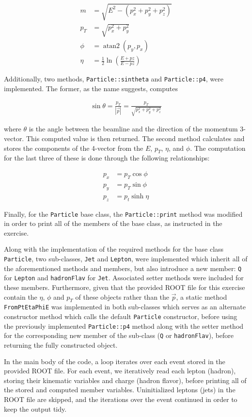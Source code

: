 \documentclass{article}
\newcounter{exercise}
\begin{document}
\begin{align*}
    m &= \sqrt{E^2 - (p_x^2 + p_y^2 + p_z^2)}\\
    p_T &= \sqrt{p_x^2 + p_y^2}\\
    \phi &=  \operatorname{atan2}(p_y, p_x)\\
    \eta &= \frac12 \ln\left(\frac{E + pz}{E - pz}\right)
\end{align*}

Additionally, two methods, \texttt{Particle::sintheta} and \texttt{Particle::p4}, were implemented. The former, as the name suggests, computes

\begin{align*}
    \sin\theta = \frac{p_T}{|\vec p|} = \frac{p_T}{\sqrt{p_x^2 + p_y^2 + p_z^2}}
\end{align*}

\noindent where $\theta$ is the angle between the beamline and the direction of the momentum 3-vector. This computed value is then returned. The second method calculates and stores the components of the 4-vector from the $E$, $p_T$, $\eta$, and $\phi$. The computation for the last three of these is done through the following relationships:

\begin{align*}
    p_x &= p_T \cos\phi\\
    p_y &= p_T \sin\phi\\
    p_z &= p_t \sinh\eta
\end{align*}

\noindent Finally, for the \texttt{Particle} base class, the \texttt{Particle::print} method was modified in order to print all of the members of the base class, as instructed in the exercise.

Along with the implementation of the required methods for the base class \texttt{Particle}, two sub-classes, \texttt{Jet} and \texttt{Lepton}, were implemented which inherit all of the aforementioned methods and members, but also introduce a new member: \texttt{Q} for \texttt{Lepton} and \texttt{hadronFlav} for \texttt{Jet}. Associated setter methods were included for these members. Furthermore, given that the provided ROOT file for this exercise contain the $\eta$, $\phi$ and $p_T$ of these objects rather than the $\vec p$, a static method \texttt{FromPtEtaPhiE} was implemented in both sub-classes which serves as an alternate constructor method which calls the default \texttt{Particle} constructor, before using the previously implemented \texttt{Particle::p4} method along with the setter method for the corresponding new member of the sub-class (\texttt{Q} or \texttt{hadronFlav}), before returning the fully constructed object.

In the main body of the code, a loop iterates over each event stored in the provided ROOT file. For each event, we iteratively read each lepton (hadron), storing their kinematic variables and charge (hadron flavor), before printing all of the stored and computed member variables. Uninitialized leptons (jets) in the ROOT file are skipped, and the iterations over the event continued in order to keep the output tidy.


\end{document}
